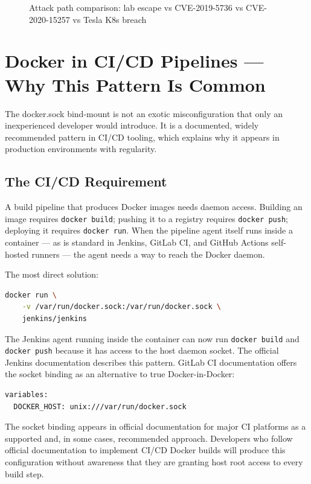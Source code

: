 \begin{figure}[h]
\centering
\vspace{3cm}
\caption{Attack path comparison: lab escape vs CVE-2019-5736 vs CVE-2020-15257 vs Tesla K8s breach}
\end{figure}


\section{Docker in CI/CD Pipelines --- Why This Pattern Is Common}

The docker.sock bind-mount is not an exotic misconfiguration that only an inexperienced developer would introduce. It is a documented, widely recommended pattern in CI/CD tooling, which explains why it appears in production environments with regularity.

\subsection{The CI/CD Requirement}

A build pipeline that produces Docker images needs daemon access. Building an image requires \texttt{docker build}; pushing it to a registry requires \texttt{docker push}; deploying it requires \texttt{docker run}. When the pipeline agent itself runs inside a container --- as is standard in Jenkins, GitLab CI, and GitHub Actions self-hosted runners --- the agent needs a way to reach the Docker daemon.

The most direct solution:

\begin{lstlisting}[language=bash]
docker run \
    -v /var/run/docker.sock:/var/run/docker.sock \
    jenkins/jenkins
\end{lstlisting}

The Jenkins agent running inside the container can now run \texttt{docker build} and \texttt{docker push} because it has access to the host daemon socket. The official Jenkins documentation describes this pattern. GitLab CI documentation offers the socket binding as an alternative to true Docker-in-Docker:

\begin{lstlisting}
variables:
  DOCKER_HOST: unix:///var/run/docker.sock
\end{lstlisting}

The socket binding appears in official documentation for major CI platforms as a supported and, in some cases, recommended approach. Developers who follow official documentation to implement CI/CD Docker builds will produce this configuration without awareness that they are granting host root access to every build step.

